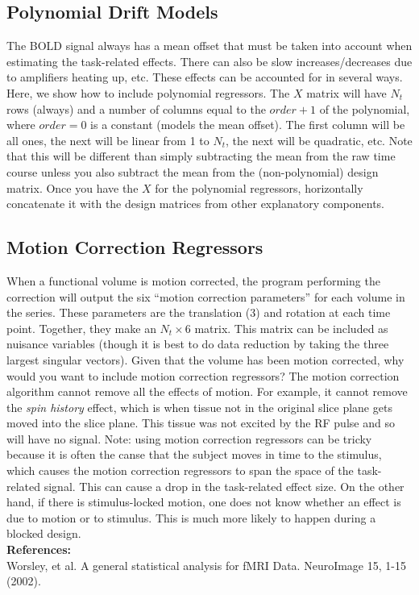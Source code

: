 \documentclass{article}
\begin{document}
\subsection{Polynomial Drift Models}

\noindent
The BOLD signal always has a mean offset that must be taken into
account when estimating the task-related effects. There can also be
slow increases/decreases due to amplifiers heating up, etc.
These effects can be accounted for in several ways. Here, we show how 
to include polynomial regressors. The $X$ matrix will have $N_t$ rows
(always) and a number of columns equal to the $order+1$ of the
polynomial, where $order=0$ is a constant (models the mean
offset). The first column will be all ones, the next will be linear
from 1 to $N_t$, the next will be quadratic, etc. Note that this will
be different than simply subtracting the mean from the raw time course
unless you also subtract the mean from the (non-polynomial) design
matrix. Once you have the $X$ for the polynomial regressors,
horizontally concatenate it with the design matrices from other
explanatory components.

\subsection{Motion Correction Regressors}

\noindent
When a functional volume is motion corrected, the program performing
the correction will output the six ``motion correction parameters''
for each volume in the series. These parameters are the translation
(3) and rotation at each time point. Together, they make an $N_t
\times 6$ matrix. This matrix can be included as nuisance variables
(though it is best to do data reduction by taking the three largest
singular vectors). Given that the volume has been motion corrected,
why would you want to include motion correction regressors? The motion
correction algorithm cannot remove all the effects of motion. For
example, it cannot remove the {\em spin history} effect, which is when
tissue not in the original slice plane gets moved into the slice
plane. This tissue was not excited by the RF pulse and so will have no
signal. Note: using motion correction regressors can be tricky because
it is often the canse that the subject moves in time to the stimulus,
which causes the motion correction regressors to span the space of the
task-related signal. This can cause a drop in the task-related effect
size. On the other hand, if there is stimulus-locked motion, one does
not know whether an effect is due to motion or to stimulus. This is
much more likely to happen during a blocked design.\\

\noindent
{\bf References:}\\

\noindent
Worsley, et al. A general statistical analysis for fMRI
Data. NeuroImage 15, 1-15 (2002). \\
\end{document}
